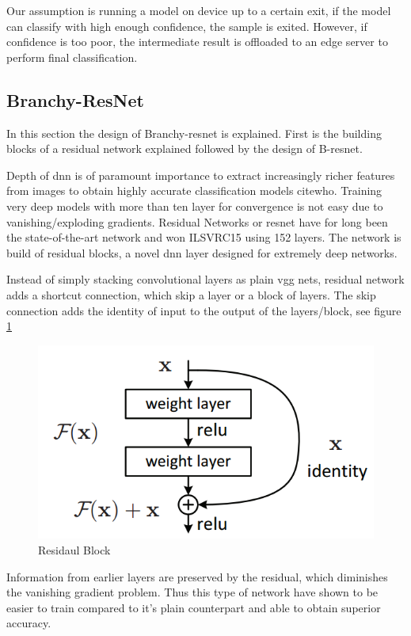 Our assumption is running a model on device up to a certain exit, if the model can classify with high enough confidence, the sample is exited. However, if confidence is too poor, the intermediate result is offloaded to an edge server to perform final classification.  

\subsection{Branchy-ResNet}

In this section the design of Branchy-\gls{resnet} is explained. First is the building blocks of a residual network explained followed by the design of B-\gls{resnet}. 

Depth of \gls{dnn} is of paramount importance to extract increasingly richer features from images to obtain highly accurate classification models cite{who}. Training very deep models with more than ten layer for convergence is not easy due to vanishing/exploding gradients. Residual Networks or \gls{resnet} \cite{he_deep_2015} have for long been the state-of-the-art network and won ILSVRC15 using 152 layers. The network is build of residual blocks, a novel \gls{dnn} layer designed for extremely deep networks. 

Instead of simply stacking convolutional layers as plain \gls{vgg} nets, residual network adds a shortcut connection, which skip a layer or a block of layers. The skip connection adds the identity of input to the output of the layers/block, see figure \ref{fig:residualblock}

\begin{figure}
	\centering
	\includegraphics[width=.5\linewidth]{figures/models/residualblock}
	\caption[Residual Block]{Residaul Block}
	\label{fig:residualblock}
\end{figure}

Information from earlier layers are preserved by the residual, which diminishes the vanishing gradient problem. Thus this type of network have shown to be easier to train compared to it’s plain counterpart and able to obtain superior accuracy.  

